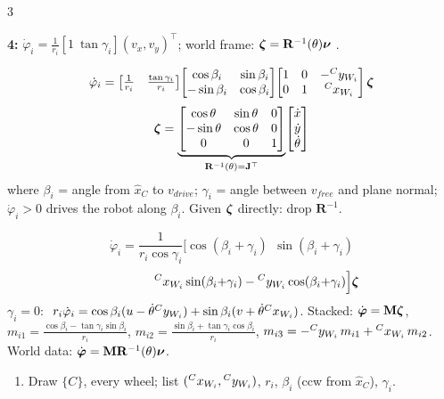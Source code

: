 \begin{multicols}{3}
\begin{deriv}
\textbf{4:} $\dot\varphi_i=\frac1{r_i}[1\ \tan\gamma_i](v_x,v_y)^\top$; world frame: $\boldsymbol\zeta=\mathbf R^{-1}(\theta)\boldsymbol\nu$ .
\end{deriv}
\begin{fbx}
\[\dot\varphi_i=\begin{bmatrix}\tfrac1{r_i}&\tfrac{\tan\gamma_i}{r_i}\end{bmatrix}\!\begin{bmatrix}\cos\beta_i&\sin\beta_i\\-\sin\beta_i&\cos\beta_i\end{bmatrix}\!\begin{bmatrix}1&0&-{}^{C}y_{W_{i}}\\0&1&{}^{C}x_{W_{i}}\end{bmatrix}\boldsymbol\zeta\]
\[\boldsymbol\zeta=\underbrace{\begin{bmatrix}\cos\theta&\sin\theta&0\\-\sin\theta&\cos\theta&0\\0&0&1\end{bmatrix}}_{\mathbf R^{-1}(\theta)=\mathbf J^\top}\!\begin{bmatrix}\dot x\\\dot y\\\dot\theta\end{bmatrix}\]
where $\beta_i$ = angle from $\hat x_C$ to $v_{drive}$; $\gamma_i$ = angle between $v_{free}$ and plane normal; $\dot\varphi_i>0$ drives the robot along $\beta_i$. Given $\boldsymbol\zeta$ directly: drop $\mathbf R^{-1}$.
\end{fbx}
\begin{fbx}
\[\dot\varphi_i=\frac1{r_i\cos\gamma_i}\Big[\cos(\beta_i{+}\gamma_i)\ \ \sin(\beta_i{+}\gamma_i)\]
\[\hspace{4em}{}^{C}x_{W_{i}}\sin(\beta_i{+}\gamma_i)-{}^{C}y_{W_{i}}\cos(\beta_i{+}\gamma_i)\Big]\boldsymbol\zeta\]
$\gamma_i=0$: $\ r_i\dot\varphi_i=\cos\beta_i(u-\dot\theta\wXy i)+\sin\beta_i(v+\dot\theta\wXx i)$. Stacked: $\dot{\boldsymbol\varphi}=\mathbf M\boldsymbol\zeta$,
$m_{i1}=\frac{\cos\beta_i-\tan\gamma_i\sin\beta_i}{r_i}$, $m_{i2}=\frac{\sin\beta_i+\tan\gamma_i\cos\beta_i}{r_i}$, $m_{i3}=-{}^{C}y_{W_{i}}\,m_{i1}+{}^{C}x_{W_{i}}\,m_{i2}$. World data: $\dot{\boldsymbol\varphi}=\mathbf M\mathbf R^{-1}(\theta)\boldsymbol\nu$. \chk
\end{fbx}
\begin{recipe}
\begin{enumerate}
\item Draw $\{C\}$, every wheel; list $({}^{C}x_{W_{i}},{}^{C}y_{W_{i}})$, $r_i$, $\beta_i$ (ccw from $\hat x_C$), $\gamma_i$.

\end{enumerate}
\end{recipe}
\end{multicols}
